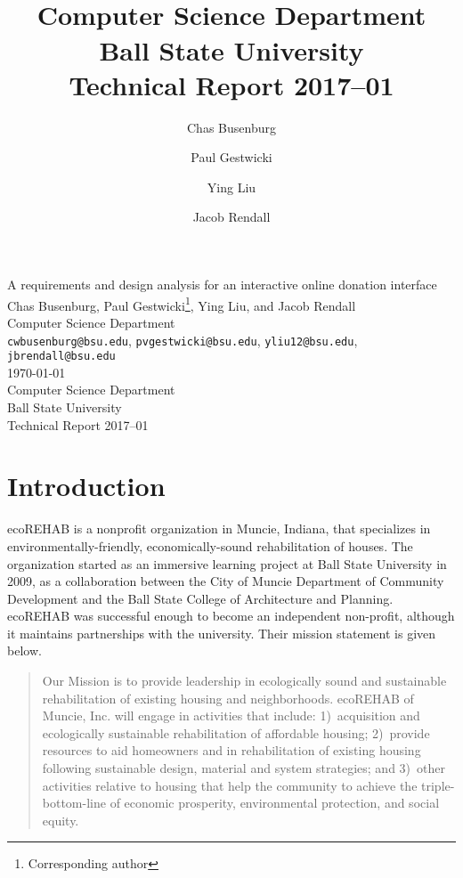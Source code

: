 \documentclass[letter]{article}
\title{\\
  Computer Science Department\\
  Ball State University\\
  Technical Report 2017--01}
\author{
  Chas Busenburg
  \and
  Paul Gestwicki
  \and
  Ying Liu
  \and
  Jacob Rendall}
\begin{document}
\begin{centering}
{\Large A requirements and design analysis for an interactive online donation interface}\\
\vspace{0.5cm}
Chas Busenburg, Paul Gestwicki\footnote{Corresponding author}, Ying Liu, and Jacob Rendall\\
Computer Science Department\\
\texttt{cwbusenburg@bsu.edu}, 
\texttt{pvgestwicki@bsu.edu},
\texttt{yliu12@bsu.edu},
\texttt{jbrendall@bsu.edu}\\
\vspace{0.5cm}
\today\\
\vspace{0.5cm}
Computer Science Department\\
Ball State University\\
Technical Report 2017--01\\
\end{centering}

\section*{Introduction}

ecoREHAB is a nonprofit organization in Muncie, Indiana, that specializes
in environmentally-friendly, economically-sound rehabilitation of houses.
The organization started as an immersive learning project at Ball
State University in 2009, as a collaboration between the 
City of Muncie Department of Community Development and the 
Ball State College of Architecture and Planning.
ecoREHAB was successful enough to become an independent non-profit, 
although it maintains partnerships with the university.
Their mission statement is given below.

\begin{quote}
  Our Mission is to provide leadership in ecologically sound and
  sustainable rehabilitation of existing housing and
  neighborhoods. ecoREHAB of Muncie, Inc. will engage in activities
  that include: 1)~acquisition and ecologically sustainable
  rehabilitation of affordable housing; 2)~provide resources to aid
  homeowners and in rehabilitation of existing housing following
  sustainable design, material and system strategies; and 3)~other
  activities relative to housing that help the community to achieve
  the triple-bottom-line of economic prosperity, environmental
  protection, and social equity.
\end{quote}
\end{document}

